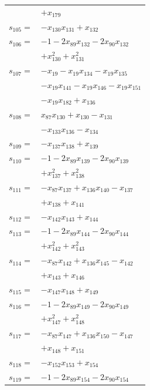 \begin{longtable}{@{}r@{\;}l@{}}
 & \(\displaystyle +x_{179}\) \\[3pt]
\(s_{105}=\) & \(\displaystyle -x_{130}x_{131} +x_{132}\) \\[3pt]
\(s_{106}=\) & \(\displaystyle -1 -2x_{89}x_{132} -2x_{90}x_{132}\) \\
 & \(\displaystyle +x_{130}^{2} +x_{131}^{2}\) \\[3pt]
\(s_{107}=\) & \(\displaystyle -x_{19} -x_{19}x_{134} -x_{19}x_{135}\) \\
 & \(\displaystyle -x_{19}x_{141} -x_{19}x_{146} -x_{19}x_{151}\) \\
 & \(\displaystyle -x_{19}x_{182} +x_{136}\) \\[3pt]
\(s_{108}=\) & \(\displaystyle x_{87}x_{130} +x_{130} -x_{131}\) \\
 & \(\displaystyle -x_{133}x_{136} -x_{134}\) \\[3pt]
\(s_{109}=\) & \(\displaystyle -x_{137}x_{138} +x_{139}\) \\[3pt]
\(s_{110}=\) & \(\displaystyle -1 -2x_{89}x_{139} -2x_{90}x_{139}\) \\
 & \(\displaystyle +x_{137}^{2} +x_{138}^{2}\) \\[3pt]
\(s_{111}=\) & \(\displaystyle -x_{87}x_{137} +x_{136}x_{140} -x_{137}\) \\
 & \(\displaystyle +x_{138} +x_{141}\) \\[3pt]
\(s_{112}=\) & \(\displaystyle -x_{142}x_{143} +x_{144}\) \\[3pt]
\(s_{113}=\) & \(\displaystyle -1 -2x_{89}x_{144} -2x_{90}x_{144}\) \\
 & \(\displaystyle +x_{142}^{2} +x_{143}^{2}\) \\[3pt]
\(s_{114}=\) & \(\displaystyle -x_{87}x_{142} +x_{136}x_{145} -x_{142}\) \\
 & \(\displaystyle +x_{143} +x_{146}\) \\[3pt]
\(s_{115}=\) & \(\displaystyle -x_{147}x_{148} +x_{149}\) \\[3pt]
\(s_{116}=\) & \(\displaystyle -1 -2x_{89}x_{149} -2x_{90}x_{149}\) \\
 & \(\displaystyle +x_{147}^{2} +x_{148}^{2}\) \\[3pt]
\(s_{117}=\) & \(\displaystyle -x_{87}x_{147} +x_{136}x_{150} -x_{147}\) \\
 & \(\displaystyle +x_{148} +x_{151}\) \\[3pt]
\(s_{118}=\) & \(\displaystyle -x_{152}x_{153} +x_{154}\) \\[3pt]
\(s_{119}=\) & \(\displaystyle -1 -2x_{89}x_{154} -2x_{90}x_{154}\) \\

\end{longtable}
